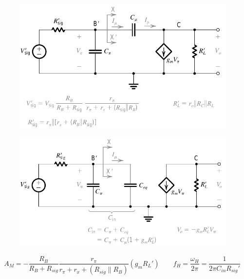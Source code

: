 \begin{figure}[H]
  \centering
  \includegraphics[width=0.8\linewidth]{figures/Frequency-Response-CE-High-2}
  \label{fig:}
\end{figure}

\begin{figure}[H]
  \centering
  \includegraphics[width=0.8\linewidth]{figures/Frequency-Response-CE-High-3}
  \label{fig:}
\end{figure}

\begin{equation*}
  \begin{aligned}
    A_M = - \dfrac{R_B}{R_B + R_{sig}} \dfrac{r_{\pi}}{r_{\pi} + r_x + \left( R_{sig} \parallel R_B \right)} \left( g_m R_L' \right) \quad\quad f_H = \dfrac{\omega_H}{2 \pi} = \dfrac{1}{2 \pi C_{in} R_{sig}'}   
  \end{aligned}
\end{equation*}

